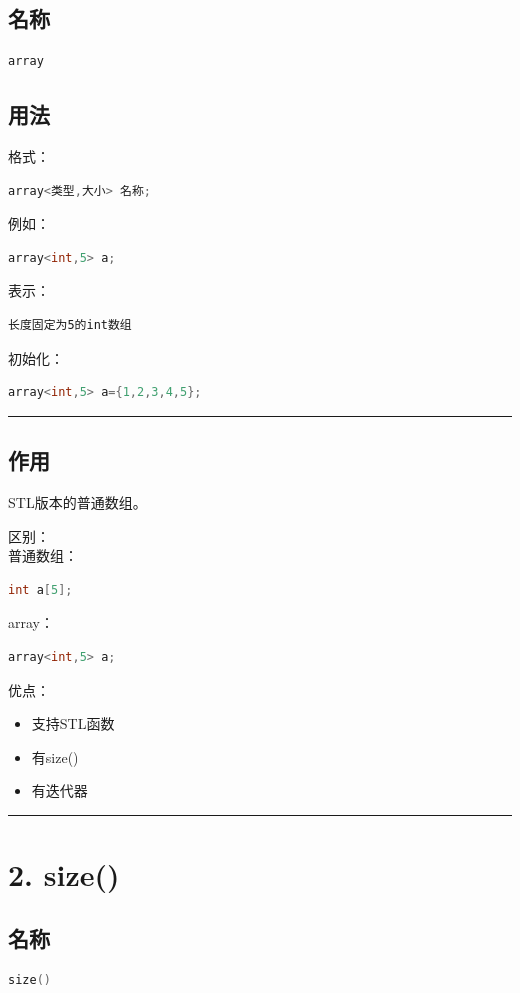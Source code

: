 \documentclass[10pt,twocolumn]{extarticle}
\begin{document}
\subsection{名称}
\begin{lstlisting}[language=C++]
array
\end{lstlisting}

\subsection{用法}
格式：
\begin{lstlisting}[language=C++]
array<类型,大小> 名称;
\end{lstlisting}
例如：
\begin{lstlisting}[language=C++]
array<int,5> a;
\end{lstlisting}
表示：
\begin{lstlisting}
长度固定为5的int数组
\end{lstlisting}
初始化：
\begin{lstlisting}[language=C++]
array<int,5> a={1,2,3,4,5};
\end{lstlisting}

\noindent\rule{\linewidth}{0.4pt}

\subsection{作用}
STL版本的普通数组。

区别：\\
普通数组：
\begin{lstlisting}[language=C++]
int a[5];
\end{lstlisting}
array：
\begin{lstlisting}[language=C++]
array<int,5> a;
\end{lstlisting}
优点：
\begin{itemize}
    \item 支持STL函数
    \item 有size()
    \item 有迭代器
\end{itemize}

\noindent\rule{\linewidth}{0.4pt}

\section{2. size()}

\subsection{名称}
\begin{lstlisting}[language=C++]
size()
\end{lstlisting}
\end{document}
